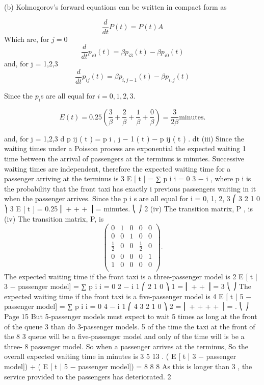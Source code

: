 \documentclass[a4paper,12pt]{article}
\begin{document}
\begin{enumerate}
(b) Kolmogorov’s forward equations can be written in compact form as

\[\frac{d}{dt} P(t)  =P(t)A\]
Which are, for $j = 0$
\[\frac{d}{dt} p_{i0}(t)  = \beta p_{i3}(t) - \beta p_{i0}(t)\]
and, for j = 1,2,3
\[\frac{d}{dt} p_{ij}(t)  = \beta p_{i,j-1}(t) - \beta p_{i,j}(t)\]


Since the $p_i$s are all equal for $i = 0, 1, 2, 3$.

\[E(t) = 0.25 \left( \frac{3}{\beta} + \frac{2}{\beta} + \frac{1}{\beta} + \frac{0}{\beta} \right)  = \frac{3}{2\beta} \mbox{
minutes}.\]





and, for j = 1,2,3
d
p ij ( t ) = \beta p i , j − 1 ( t ) − \beta p ij ( t ) .
dt
(iii)
Since the waiting times under a Poisson process are exponential the expected waiting
1
time between the arrival of passengers at the terminus is minutes.
\beta
Successive waiting times are independent, therefore the expected waiting time for a
passenger arriving at the terminus is
3
E [ t ] = ∑ p i
i = 0
3 − i
,
\beta
where p i is the probability that the front taxi has exactly i previous passengers waiting
in it when the passenger arrives.
Since the p i s are all equal for i = 0, 1, 2, 3
⎛ 3 2 1 0 ⎞ 3
E [ t ] = 0.25 ⎜ + + + ⎟ =
minutes.
⎝ \beta \beta \beta \beta ⎠ 2 \beta
(iv)
The transition matrix, P , is
(iv) The transition matrix, P, is
\[\begin{pmatrix}
0 & 1 & 0 & 0 & 0 \\
0 & 0 & 1 & 0 & 0 \\
\frac{1}{2} &  0 & 0 & \frac{1}{2} & 0\\
0 & 0 & 0 & 0 & 1 \\
1 & 0 & 0 &  0 & 0 \\
\end{pmatrix}.
\]
The expected waiting time if the front taxi is a three-passenger model is
2
E [ t | 3 − passenger model] = ∑ p i
i = 0
2 − i 1 ⎛ 2 1 0 ⎞ 1
= ⎜ + + ⎟ =
3 ⎝ \beta \beta \beta ⎠ \beta
\beta
The expected waiting time if the front taxi is a five-passenger model is
4
E [ t | 5 − passenger model] = ∑ p i
i = 0
4 − i 1 ⎛ 4 3 2 1 0 ⎞ 2
= ⎜ + + + + ⎟ = .
 ⎝ \beta \beta \beta \beta \beta ⎠ \beta
Page 15 %
But 5-passenger models must expect to wait
5
times as long at the front of the queue
3
than do 3-passenger models.
5
of the time the taxi at the front of the
8
3
queue will be a five-passenger model and only of the time will is be a three-
8
passenger model.
So when a passenger arrives at the terminus,
So the overall expected waiting time in minutes is
3
5
13
.
( E [ t | 3 − passenger model]) + ( E [ t | 5 − passenger model]) =
8
8
8 \beta
As this is longer than
3
, the service provided to the passengers has deteriorated.
2\beta


\end{enumerate}
\end{document}
